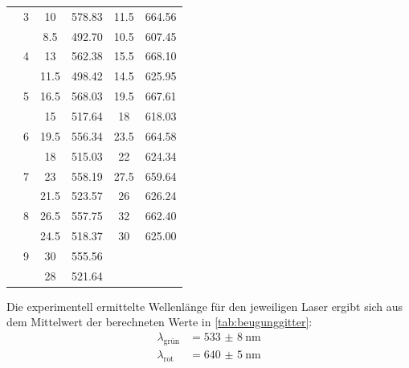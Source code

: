 \begin{table}[H]
\begin{tabular}{c S[table-format=1.0] S[table-format=2.1] S[table-format=3.2] S[table-format=2.1] S[table-format=3.2]}
                    & 3 &  10  & 578.83 &11.5 & 664.56 \\
                    &   & 8.5  & 492.70 &10.5 & 607.45 \\
                    & 4 & 13   & 562.38 & 15.5& 668.10 \\
                    &   & 11.5 & 498.42 & 14.5& 625.95 \\
                    & 5 & 16.5 & 568.03 & 19.5& 667.61 \\
                    &   &  15  & 517.64 &  18 & 618.03 \\
                    & 6 &  19.5& 556.34 & 23.5& 664.58 \\
                    &   &  18  & 515.03 &  22 & 624.34 \\
                    & 7 & 23   & 558.19 & 27.5& 659.64 \\
                    &   & 21.5 & 523.57 &  26 & 626.24 \\
                    & 8 & 26.5 & 557.75 &  32 & 662.40 \\
                    &   & 24.5 & 518.37 &  30 & 625.00 \\
                    & 9 & 30   & 555.56 &     & \\
                    &   &  28  & 521.64 &     & \\
      \bottomrule 
    \end{tabular}
  \end{table}

  \noindent Die experimentell ermittelte Wellenlänge für den jeweiligen Laser ergibt sich aus dem Mittelwert der berechneten Werte in \autoref{tab:beugunggitter}:
  \begin{align*}
    \lambda_{\text{grün}} &= \SI{533(8)}{\nano\metre}\\
    \lambda_{\text{rot}}  &= \SI{640(5)}{\nano\metre}
  \end{align*}